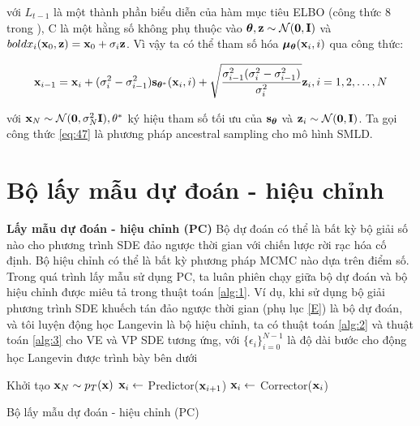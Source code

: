 \documentclass{article} %
\begin{document}
với $L_{t-1}$ là một thành phần biểu diễn của hàm mục tiêu ELBO (công thức 8 trong \citep{ho2020denoising}), C là một hằng số không phụ thuộc vào $\boldsymbol{\theta}, \bold{z} \sim \mathcal{N}(\bold{0}, \bold{I})$ và $bold{x}_i (\bold{x}_0, \bold{z})=\bold{x}_0 + \sigma_i \bold{z}$.
Vì vậy ta có thể tham số hóa $\boldsymbol{\mu}_{\boldsymbol{\theta}}(\bold{x}_i, i)$ qua công thức:

\begin{equation} \label{eq:47}
    \bold{x}_{i-1} = \bold{x}_i + (\sigma_i^2 - \sigma_{i-1}^2) \bold{s}_{\boldsymbol{\theta}^{\ast}} (\bold{x}_i, i) + \sqrt{\dfrac{\sigma_{i-1}^2 (\sigma_i^2 - \sigma_{i-1}^2)}{\sigma_i^2}} \bold{z}_i, i = 1, 2, \dots, N
\end{equation}

với $\bold{x}_N \sim \mathcal{N}(\bold{0}, \sigma_N^2 \bold{I}), \bold{\theta}^{\ast}$ ký hiệu tham số tối ưu của $\bold{s}_{\boldsymbol{\theta}}$ và $\bold{z}_i \sim \mathcal{N}(\bold{0}, \bold{I})$.
Ta gọi công thức \ref{eq:47} là phương pháp ancestral sampling cho mô hình SMLD.

\section{Bộ lấy mẫu dự đoán - hiệu chỉnh} \label{G}

\textbf{Lấy mẫu dự đoán - hiệu chỉnh (PC)} Bộ dự đoán có thể là bất kỳ bộ giải số nào cho phương trình SDE đảo ngược thời gian với chiến lược rời rạc hóa cố định.
Bộ hiệu chỉnh có thể là bất kỳ phương pháp MCMC nào dựa trên điểm số.
Trong quá trình lấy mẫu sử dụng PC, ta luân phiên chạy giữa bộ dự đoán và bộ hiệu chỉnh được miêu tả trong thuật toán \ref{alg:1}.
Ví dụ, khi sử dụng bộ giải phương trình SDE khuếch tán đảo ngược thời gian (phụ lục \ref{E}) là bộ dự đoán, và tôi luyện động học Langevin \citep{song2019generative} là bộ hiệu chỉnh, ta có thuật toán \ref{alg:2} và thuật toán \ref{alg:3} cho VE và VP SDE tương ứng,
với $\lbrace \epsilon_i \rbrace_{i=0}^{N-1}$ là độ dài bước cho động học Langevin được trình bày bên dưới

\begin{algorithm}[h!]
    \DontPrintSemicolon
    Khởi tạo $\bold{x}_N \sim p_T(\bold{x})$\;
     {
        $\bold{x}_i \gets$ Predictor($\bold{x}_{i+1}$)\;
         {
            $\bold{x}_i \gets$ Corrector($\bold{x}_i$)\;
        }
    }
    \;
    \caption{Bộ lấy mẫu dự đoán - hiệu chỉnh (PC)}
    \label{alg:1}
\end{algorithm}
\end{document}
